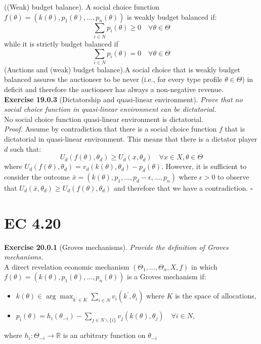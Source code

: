 ((Weak) budget balance). A social choice function $f(\theta)=\left(k(\theta), p_{1}(\theta), \ldots, p_{n}(\theta)\right)$ is weakly budget balanced if:
$$
\sum_{i \in N} p_{i}(\theta) \geqslant 0 \quad \forall \theta \in \Theta
$$
while it is strictly budget balanced if
$$
\sum_{i \in N} p_{i}(\theta)=0 \quad \forall \theta \in \Theta
$$
(Auctions and (weak) budget balance).A social choice that is weakly budget balanced assures the auctioneer to be never (i.e., for every type profile $\theta \in \Theta$) in deficit and therefore the auctioneer has always a non-negative revenue.\\

\textbf{Exercise 19.0.3} (Dictatorship and quasi-linear environment). \textit{Prove that no social choice function in quasi-linear environment can be dictatorial.}\\

No social choice function quasi-linear environment is dictatorial.\\
\textit{Proof.} Assume by contradiction that there is a social choice function $f$ that is dictatorial in quasi-linear environment. This means that there is a dictator player $d$ such that:
$$
U_{d}\left(f(\theta), \theta_{d}\right) \geqslant U_{d}\left(x, \theta_{d}\right) \quad \forall x \in X, \theta \in \Theta
$$
where $U_{d}\left(f(\theta), \theta_{d}\right)=v_{d}\left(k(\theta), \theta_{d}\right)-p_{d}(\theta) .$ However, it is sufficient to consider the outcome $\bar{x}=\left(k(\theta), p_{1}, \ldots, p_{d} - \epsilon, \ldots, p_{n}\right)$ where $\epsilon>0$ to observe that $U_{d}\left(\bar{x}, \theta_{d}\right) \geqslant U_{d}\left(f(\theta), \theta_{d}\right)$ and therefore that we have a contradiction. $\square$

\section{EC 4.20}

\textbf{Exercise 20.0.1} (Groves mechanisms). \textit{Provide the definition of Groves mechanisms.}\\

A direct revelation economic mechanism $\left(\Theta_{1}, \ldots, \Theta_{n}, X, f\right)$ in which $f(\theta)=\left(k(\theta), p_{1}(\theta), \ldots, p_{n}(\theta)\right)$ is a Groves mechanism if:
\begin{itemize}
\item $k(\theta) \in \arg \max _{k^{\prime} \in K} \sum_{i \in N} v_{i}\left(k^{\prime}, \theta_{i}\right)$ where $K$ is the space of allocations,
\item $p_{i}(\theta)=h_{i}\left(\theta_{-i}\right)-\sum_{j \in N \backslash\{i\}} v_{j}\left(k(\theta), \theta_{j}\right) \quad \forall i \in N$,
\end{itemize}
where $h_{i}: \Theta_{-i} \rightarrow \mathbb{R}$ is an arbitrary function on $\theta_{-i}$\\

